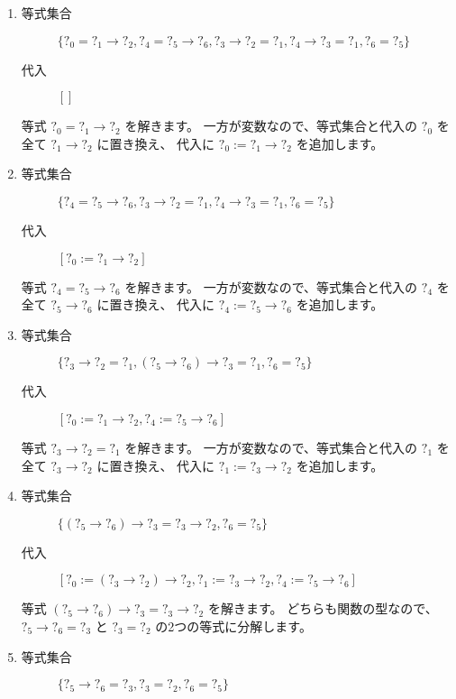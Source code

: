 \begin{enumerate}
  \item
    \begin{description}
      \item[等式集合]
        $\{?_0 = ?_1 \to ?_2, ?_4 = ?_5 \to ?_6, ?_3 \to ?_2 = ?_1, ?_4 \to ?_3 = ?_1, ?_6 = ?_5\}$
      \item[代入]
        $[]$
    \end{description}
    等式 $?_0 = ?_1 \to ?_2$ を解きます。
    一方が変数なので、等式集合と代入の $?_0$ を全て $?_1 \to ?_2$ に置き換え、
    代入に $?_0 := ?_1 \to ?_2$ を追加します。
  \item
    \begin{description}
      \item[等式集合]
        $\{?_4 = ?_5 \to ?_6, ?_3 \to ?_2 = ?_1, ?_4 \to ?_3 = ?_1, ?_6 = ?_5\}$
      \item[代入]
        $[?_0 := ?_1 \to ?_2]$
    \end{description}
    等式 $?_4 = ?_5 \to ?_6$ を解きます。
    一方が変数なので、等式集合と代入の $?_4$ を全て $?_5 \to ?_6$ に置き換え、
    代入に $?_4 := ?_5 \to ?_6$ を追加します。
  \item
    \begin{description}
      \item[等式集合]
        $\{?_3 \to ?_2 = ?_1, (?_5 \to ?_6) \to ?_3 = ?_1, ?_6 = ?_5\}$
      \item[代入]
        $[?_0 := ?_1 \to ?_2, ?_4 := ?_5 \to ?_6]$
    \end{description}
    等式 $?_3 \to ?_2 = ?_1$ を解きます。
    一方が変数なので、等式集合と代入の $?_1$ を全て $?_3 \to ?_2$ に置き換え、
    代入に $?_1 := ?_3 \to ?_2$ を追加します。
  \item
    \begin{description}
      \item[等式集合]
        $\{(?_5 \to ?_6) \to ?_3 = ?_3 \to ?_2, ?_6 = ?_5\}$
      \item[代入]
        $[?_0 := (?_3 \to ?_2) \to ?_2, ?_1 := ?_3 \to ?_2, ?_4 := ?_5 \to ?_6]$
    \end{description}
    等式 $(?_5 \to ?_6) \to ?_3 = ?_3 \to ?_2$ を解きます。
    どちらも関数の型なので、$?_5 \to ?_6 = ?_3$ と $?_3 = ?_2$ の2つの等式に分解します。
  \item
    \begin{description}
      \item[等式集合]
        $\{?_5 \to ?_6 = ?_3, ?_3 = ?_2, ?_6 = ?_5\}$

\end{description}
\end{enumerate}
